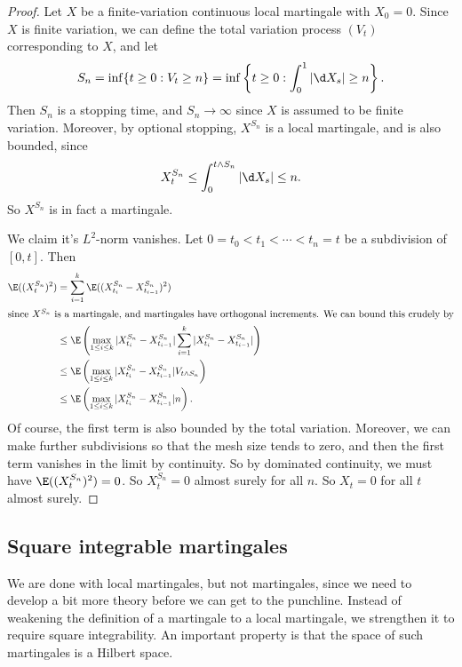 \documentclass[a4paper]{article}
\begin{document}
\begin{proof}
  Let $X$ be a finite-variation continuous local martingale with $X_0 = 0$. Since $X$ is finite variation, we can define the total variation process $(V_t)$ corresponding to $X$, and let
  \[
    S_n = \inf \{t \geq 0: V_t \geq n\} = \inf \left\{t \geq 0: \int_0^1 |\d X_s| \geq n\right\}.
  \]
  Then $S_n$ is a stopping time, and $S_n \to \infty$ since $X$ is assumed to be finite variation. Moreover, by optional stopping, $X^{S_n}$ is a local martingale, and is also bounded, since
  \[
    X_t^{S_n} \leq \int_0^{t \wedge S_n} |\d X_s| \leq n.
  \]
  So $X^{S_n}$ is in fact a martingale.

  We claim it's $L^2$-norm vanishes. Let $0 = t_0 < t_1 < \cdots < t_n = t$ be a subdivision of $[0, t]$. Then
  \begin{align*}
    \E((X_t^{S_n})^2) &= \sum_{i = 1}^k \E((X_{t_i}^{S_n} - X_{t_{i - 1}}^{S_n})^2)\\
    \intertext{since $X^{S_n}$ is a martingale, and martingales have orthogonal increments. We can bound this crudely by}
    &\leq \E\left(\max_{1 \leq i \leq k} |X_{t_i}^{S_n} - X_{t_{i - 1}}^{S_n}| \sum_{i =1 }^k |X_{t_i}^{S_n} - X_{t_{i - 1}}^{S_n}|\right)\\
    &\leq \E\left(\max_{1 \leq i \leq k} |X_{t_i}^{S_n} - X_{t_{i - 1}}^{S_n}| V_{t \wedge S_n}\right)\\
    &\leq \E\left(\max_{1 \leq i \leq k} |X_{t_i}^{S_n} - X_{t_{i - 1}}^{S_n}| n\right).
  \end{align*}
  Of course, the first term is also bounded by the total variation. Moreover, we can make further subdivisions so that the mesh size tends to zero, and then the first term vanishes in the limit by continuity. So by dominated continuity, we must have $\E((X_t^{S_n})^2) = 0$. So $X_t^{S_n} = 0$ almost surely for all $n$. So $X_t = 0$ for all $t$ almost surely.
\end{proof}

\subsection{Square integrable martingales}
We are done with local martingales, but not martingales, since we need to develop a bit more theory before we can get to the punchline. Instead of weakening the definition of a martingale to a local martingale, we strengthen it to require square integrability. An important property is that the space of such martingales is a Hilbert space.
\end{document}
